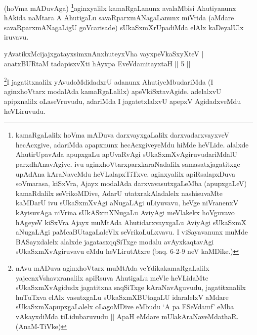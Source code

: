 \begin{artha}
(hoVma mADuvAga) \footnote{kamaRgaLalilx hoVma mADuva darxvayxgaLalilx darxvadarxvayxveV hecAcxgive, adariMda apapxnunx hecAcxgiveyeMdu hiMde heVLide. alalxde AhutirUpavAda apupxgaLu apUvaRvAgi sUkaSxmXvAgiruvudariMdalU parxdhAnavAgive. ivu aginxhoVtarxparxkaraNadalilx samasatxjagatitxge upAdAna kAraNaveMdu heVLalapxTiTxve. aginxyalilx apiRsalapxDuva soVmarasa, kiSxVra, Ajayx modalAda darxvavasutxgaLeMba (apupxgaLeV) kamaRdalilx seVrikoMDive, AdarU utatxrakAladalelx nashisuvaMte kaMDarU ivu sUkaSxmXvAgi aNugaLAgi uLiyuvavu, heVge niVranenxV kAyisuvAga niVrina sUkASxmXNugaLu AviyAgi meVlakekx hoVguvavo hAgeyeV kiSxVra Ajayx muMtAda AhutidarxvayxgaLu AviyAgi sUkaSxmX aNugaLAgi paMcaBUtagaLaleVlx seVrikoLuLxvavu. I viSayavanunx muMde BASayxdalelx alalxde jagatasxqqSiTxge modalu avAyxkaqtavAgi sUkaSxmXvAgiruvavu eMdu heVLirutAtxre (baq. 6-2-9 neV kaMDike.)}aginxyalilx kamaRgaLanunx avalaMbisi Ahutiyanunx hAkida naMtara A AhutigaLu savaRparxmANagaLanunx miVrida (aMdare savaRparxmANagaLigU goVcarisade) sUkaSxmXrUpadiMda elAlx kaDeyalUlx iruvavu.
\end{artha}


\begin{shl}
yAvatikxMcijajxgatayxsimxnAnxhuteyxVha vayxpeVkaSxyXteV | \\
anatxBURtaM tadapisxvXti hAyxpa EveVdamitayxtaH \hfill ||  5 || 
\end{shl}

\begin{artha}
\footnote{nAvu mADuva aginxhoVtarx muMtAda veYdikakamaRgaLalilx yajecnxVshavxranalilx apiRsuva AhutigaLu meVle heVLidaMte sUkaSxmXvAgidudx jagatitxna saqSiTxge kAraNavAguvudu, jagatitxnalilx huTuTxva elAlx vasutxgaLu sUkaSxmXBUtagaLU idaralelxV aMdare sUkaSxmXapupxgaLalelx oLagoMDive eMbudu `A pa ESeVdamf' eMba vAkayxdiMda tiLidubaruvudu || ApaH eMdare mUlakAraNaveMdathaR. (AnaM-TiVke)}I jagatitxnalilx yAvudoMdidadxrU adanunx AhutiyeMbudariMda (I aginxhoVtarx modalAda kamaRgaLalilx) apeVkiSxtavAgide. adelalxvU apipxnalilx oLaseVruvudu, adariMda I jagatetxlalxvU apepxV AgidadxveMdu heVLiruvudu.
\end{artha}



